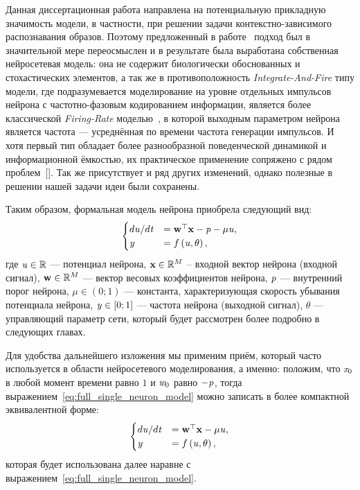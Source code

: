 Данная диссертационная работа направлена на потенциальную прикладную значимость модели, в частности, при решении задачи контекстно-зависимого распознавания образов. Поэтому предложенный в работе~\cite{EmelyanovYaroslavsky1990} подход был в значительной мере переосмыслен и в результате была выработана собственная нейросетевая модель: она не содержит биологически обоснованных и стохастических элементов, а так же в противоположность \textit{Integrate-And-Fire} типу модели, где подразумевается моделирование на уровне отдельных импульсов нейрона с частотно-фазовым кодированием информации, является более классической \textit{Firing-Rate}  моделью~\cite{Dayan2001}, в которой выходным параметром нейрона является \socalled частота --- усреднённая по времени частота генерации импульсов. И хотя первый тип обладает более разнообразной поведенческой динамикой и информационной ёмкостью, их практическое применение сопряжено с рядом проблем~[]. Так же присутствует и ряд других изменений, однако полезные в решении нашей задачи идеи были сохранены.

Таким образом, формальная модель нейрона приобрела следующий вид:
\begin{equation}
	\label{eq:full_single_neuron_model}
    \begin{cases}
	    d\mathit{u}/d\mathit{t} &= \mathrm{\mathbf{w}}^{\top} \mathrm{\mathbf{x}} - \mathit{p} - \mu \mathit{u}, \\
        \mathit{y}              &= f\left( \mathit{u}, \theta \right), \\
    \end{cases}
\end{equation}
где $\mathit{u} \in \mathbb{R}$ --- потенциал нейрона, $\mathrm{\mathbf{x}} \in \mathbb{R}^{M}$ -- входной вектор нейрона (входной сигнал), $\mathrm{\mathbf{w}} \in \mathbb{R}^{M}$ --- вектор весовых коэффициентов нейрона,  $\mathit{p}$ --- внутренний порог нейрона, $\mu \in \left(0;1\right)$ --- константа, характеризующая скорость убывания потенциала нейрона, $\mathit{y} \in \left[0;1\right]$ --- частота нейрона (выходной сигнал), $\theta$ --- управляющий параметр сети, который будет рассмотрен более подробно в следующих главах. 

Для удобства дальнейшего изложения мы применим приём, который часто используется в области нейросетевого моделирования, а именно: положим, что $\vectoritem{x}{0}$ в любой момент времени равно $1$ и $\vectoritem{w}{0}$ равно $-\mathit{p}$, тогда выражением~\eqref{eq:full_single_neuron_model} можно записать в более компактной эквивалентной форме:
\begin{equation}
    \label{eq:single_neuron_model}
    \begin{cases}
    d\mathit{u}/d\mathit{t} &= \mathrm{\mathbf{w}}^{\top} \mathrm{\mathbf{x}} - \mu \mathit{u}, \\
    \mathit{y}              &= f\left( \mathit{u}, \theta \right), \\
    \end{cases}
\end{equation}
которая будет использована далее наравне с выражением~\eqref{eq:full_single_neuron_model}.

